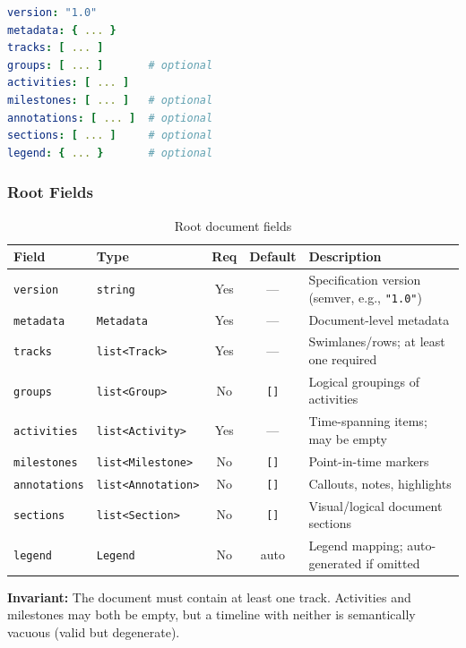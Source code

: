 \begin{lstlisting}[language=yaml,caption={Root document structure}]
version: "1.0"
metadata: { ... }
tracks: [ ... ]
groups: [ ... ]       # optional
activities: [ ... ]
milestones: [ ... ]   # optional
annotations: [ ... ]  # optional
sections: [ ... ]     # optional
legend: { ... }       # optional
\end{lstlisting}

\subsubsection{Root Fields}

\begin{table}[h]
\centering
\small
\begin{tabular}{llccp{5cm}}
\toprule
\textbf{Field} & \textbf{Type} & \textbf{Req} & \textbf{Default} & \textbf{Description} \\
\midrule
\texttt{version} & \texttt{string} & Yes & --- & Specification version (semver, e.g., \texttt{"1.0"}) \\
\texttt{metadata} & \texttt{Metadata} & Yes & --- & Document-level metadata \\
\texttt{tracks} & \texttt{list<Track>} & Yes & --- & Swimlanes/rows; at least one required \\
\texttt{groups} & \texttt{list<Group>} & No & \texttt{[]} & Logical groupings of activities \\
\texttt{activities} & \texttt{list<Activity>} & Yes & --- & Time-spanning items; may be empty \\
\texttt{milestones} & \texttt{list<Milestone>} & No & \texttt{[]} & Point-in-time markers \\
\texttt{annotations} & \texttt{list<Annotation>} & No & \texttt{[]} & Callouts, notes, highlights \\
\texttt{sections} & \texttt{list<Section>} & No & \texttt{[]} & Visual/logical document sections \\
\texttt{legend} & \texttt{Legend} & No & auto & Legend mapping; auto-generated if omitted \\
\bottomrule
\end{tabular}
\caption{Root document fields}
\label{tab:root-fields}
\end{table}

\textbf{Invariant:} The document must contain at least one track. Activities and milestones
may both be empty, but a timeline with neither is semantically vacuous (valid but degenerate).


